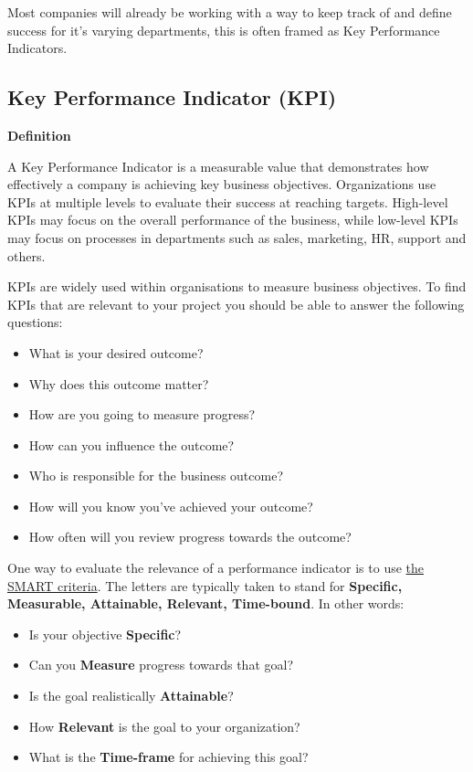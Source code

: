 \documentclass[
]{book}
\providecommand{\tightlist}{%
  \setlength{\itemsep}{0pt}\setlength{\parskip}{0pt}}
\begin{document}
Most companies will already be working with a way to keep track of and
define success for it's varying departments, this is often framed as Key
Performance Indicators.

\hypertarget{key-performance-indicator-kpi}{%
\subsection{Key Performance Indicator
(KPI)}\label{key-performance-indicator-kpi}}

\begin{infobox}

\textbf{Definition}

A Key Performance Indicator is a measurable value that demonstrates how
effectively a company is achieving key business objectives.
Organizations use KPIs at multiple levels to evaluate their success at
reaching targets. High-level KPIs may focus on the overall performance
of the business, while low-level KPIs may focus on processes in
departments such as sales, marketing, HR, support and others.

\end{infobox}

KPIs are widely used within organisations to measure business
objectives. To find KPIs that are relevant to your project you should be
able to answer the following questions:

\begin{itemize}
\tightlist
\item
  What is your desired outcome?
\item
  Why does this outcome matter?
\item
  How are you going to measure progress?
\item
  How can you influence the outcome?
\item
  Who is responsible for the business outcome?
\item
  How will you know you've achieved your outcome?
\item
  How often will you review progress towards the outcome?
\end{itemize}

One way to evaluate the relevance of a performance indicator is to use
\href{http://en.wikipedia.org/wiki/SMART_criteria}{the SMART criteria}.
The letters are typically taken to stand for \textbf{Specific,
Measurable, Attainable, Relevant, Time-bound}. In other words:

\begin{itemize}
\tightlist
\item
  Is your objective \textbf{Specific}?
\item
  Can you \textbf{Measure} progress towards that goal?
\item
  Is the goal realistically \textbf{Attainable}?
\item
  How \textbf{Relevant} is the goal to your organization?
\item
  What is the \textbf{Time-frame} for achieving this goal?
\end{itemize}
\end{document}
